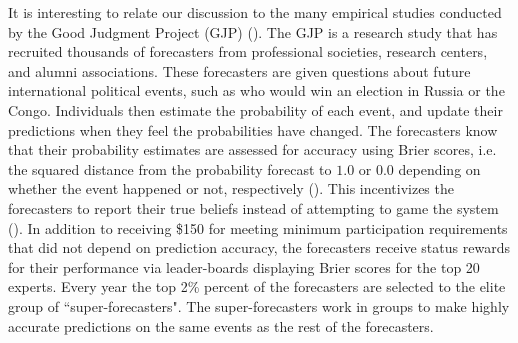 \documentclass[11pt]{article}
\theoremstyle{definition}
\theoremstyle{definition}
\begin{document}
It is interesting to relate our discussion to the many empirical studies conducted by the Good Judgment Project (GJP) (\cite{mellers2014psychological, ungar2012good}). The GJP is a research study that has recruited thousands of forecasters from professional societies, research centers, and alumni associations. These forecasters are given questions about future international political events, such as who would win an election in Russia or the Congo. Individuals then estimate the probability of each event, and update their predictions when they feel the probabilities have changed. The forecasters know that their probability estimates are assessed for accuracy using Brier scores, i.e. the squared distance from the  probability forecast to $1.0$ or $0.0$ depending on whether the event happened or not, respectively (\cite{Brier}). This incentivizes the forecasters to report their true beliefs instead of attempting to game the system (\citet{winkler1968good}). In addition to receiving \$150 for meeting minimum participation requirements that did not depend on prediction accuracy, the forecasters receive status rewards for their performance via leader-boards displaying Brier scores for the top 20 experts. Every year the top 2\% percent of the forecasters are selected to the elite group of ``super-forecasters". The super-forecasters work in groups to make highly accurate predictions on the same events as the rest of the forecasters. 


\end{document}

